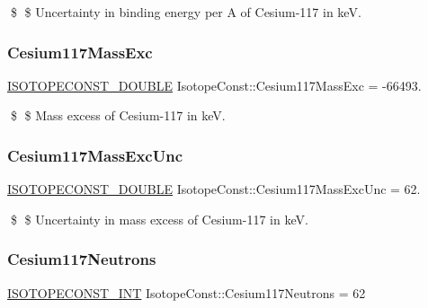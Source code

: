 \$ \$ Uncertainty in binding energy per A of Cesium-\/117 in keV. \mbox{\label{group___isotope_const-_cesium-_cs117_gad90c615f0469504dd91ce5fd8f290341}} 
\subsubsection{\texorpdfstring{Cesium117\+Mass\+Exc}{Cesium117MassExc}}
{\footnotesize\ttfamily \mbox{\hyperlink{group___isotope_const-_macros_ga8f45a7272ce02c0b4c65c44636ed719a}{I\+S\+O\+T\+O\+P\+E\+C\+O\+N\+S\+T\+\_\+\+D\+O\+U\+B\+LE}} Isotope\+Const\+::\+Cesium117\+Mass\+Exc = -\/66493.}

\$ \$ Mass excess of Cesium-\/117 in keV. \mbox{\label{group___isotope_const-_cesium-_cs117_ga8abf8f738406cf7401ec77b883b1c1d4}} 
\subsubsection{\texorpdfstring{Cesium117\+Mass\+Exc\+Unc}{Cesium117MassExcUnc}}
{\footnotesize\ttfamily \mbox{\hyperlink{group___isotope_const-_macros_ga8f45a7272ce02c0b4c65c44636ed719a}{I\+S\+O\+T\+O\+P\+E\+C\+O\+N\+S\+T\+\_\+\+D\+O\+U\+B\+LE}} Isotope\+Const\+::\+Cesium117\+Mass\+Exc\+Unc = 62.}

\$ \$ Uncertainty in mass excess of Cesium-\/117 in keV. \mbox{\label{group___isotope_const-_cesium-_cs117_ga626b65b8283b28243e6ce4cd21fa1982}} 
\subsubsection{\texorpdfstring{Cesium117\+Neutrons}{Cesium117Neutrons}}
{\footnotesize\ttfamily \mbox{\hyperlink{group___isotope_const-_macros_ga5f18360b3e99483a35c32d789e62621c}{I\+S\+O\+T\+O\+P\+E\+C\+O\+N\+S\+T\+\_\+\+I\+NT}} Isotope\+Const\+::\+Cesium117\+Neutrons = 62}

